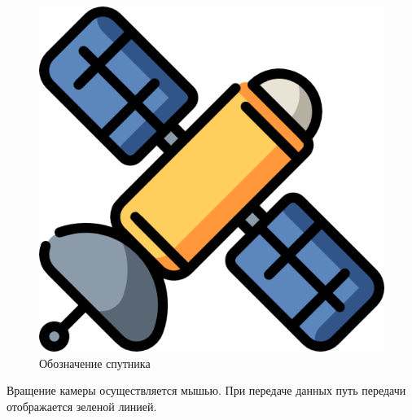\begin{figure}[H]
    \centering
    \includegraphics[width=0.25\linewidth]{satellite.png}
    \caption{Обозначение спутника}
    \label{fig:satellite}
\end{figure}

Вращение камеры осуществляется мышью. При передаче данных путь передачи отображается зеленой линией.